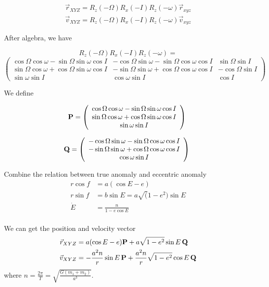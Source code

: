 \documentclass[12pt]{article}
\begin{document}
\begin{align} 
\vec{r}_{XYZ}=R_{z}(-\Omega)R_{x}(-I)R_{z}(-\omega)\vec{r}_{xyz} \\
\vec{v}_{XYZ}=R_{z}(-\Omega)R_{x}(-I)R_{z}(-\omega)\vec{v}_{xyz}
\end{align}

After algebra, we have 

\[ R_{z}(-\Omega)R_{x}(-I)R_{z}(-\omega) =      \]
\[ \left ( \begin{array}{ccc}
 \cos \Omega \cos \omega -\sin \Omega \sin \omega \cos I & -\cos \Omega \sin \omega- \sin \Omega \cos \omega \cos I & \sin \Omega \sin I   \\
 \sin \Omega \cos \omega +\cos \Omega \sin \omega \cos I& -\sin \Omega \sin \omega+\cos \Omega \cos\omega\cos I& -\cos\Omega\sin I \\
\sin \omega \sin I& \cos \omega \sin I& \cos I \end{array} \right )\ \]

We define 

\[ {\bf P}=   \left ( \begin{array}{ccc}
 \cos \Omega \cos \omega -\sin \Omega \sin \omega \cos I  \\
 \sin \Omega \cos \omega +\cos \Omega \sin \omega \cos I \\
\sin \omega \sin I  \end{array} \right )\ \]

\[ {\bf Q}=   \left ( \begin{array}{ccc}
 -\cos \Omega \sin \omega- \sin \Omega \cos \omega \cos I \\
 -\sin \Omega \sin \omega+\cos \Omega \cos\omega\cos I \\
\cos \omega \sin I  \end{array} \right )\ \]

Combine the relation between true anomaly and eccentric anomaly
\begin{align} 
r\cos f&=a(\cos E-e)\\
r\sin f&= b\sin E=a\sqrt(1-e^{2})\sin E\\
\dot{E}&=\frac{n}{1-e\cos E}\\
\end{align}

We can get the position and velocity vector
\begin{align} 
\vec{r}_{XYZ}&=a(\cos E -e) {\bf P}+a\sqrt{1-e^{2}}\sin E\,  {\bf Q} \\
\vec{v}_{XYZ}&=-\frac{a^{2}n}{r}\sin E\,  {\bf P}+\frac{a^{2}n}{r}\sqrt{1-e^{2}}\cos E\,  {\bf Q}
\end{align}
where $n=\frac{2\pi}{T}=\sqrt{\frac{G(m_{1}+m_{2})}{a^{3}}}$.
\end{document}

